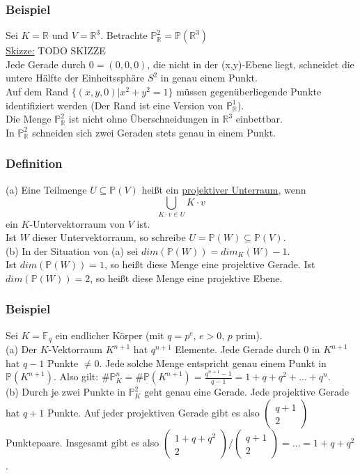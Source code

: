 \documentclass[a4paper]{article}
\newcommand{\ul}{\underline}
\begin{document}
\subsubsection{Beispiel}
Sei \(K=\mathbb{R}\) und \(V=\mathbb{R}^3\). Betrachte \(\mathbb{P}_\mathbb{R}^2=\mathbb{P}(\mathbb{R}^3)\)\\
\ul{Skizze:} TODO SKIZZE\\
Jede Gerade durch \(0=(0, 0, 0)\), die nicht in der (x,y)-Ebene liegt, schneidet die untere Hälfte der Einheitssphäre \(S^2\) in genau einem Punkt.\\
Auf dem Rand \(\{(x,y,0)|x^2+y^2=1\}\) müssen gegenüberliegende Punkte identifiziert werden (Der Rand ist eine Version von \(\mathbb{P}_\mathbb{R}^1\)).\\
Die Menge \(\mathbb{P}_\mathbb{R}^2\) ist nicht ohne Überschneidungen in \(\mathbb{R}^3\) einbettbar.\\
In \(\mathbb{P}_\mathbb{R}^2\) schneiden sich zwei Geraden stets genau in einem Punkt.
\subsubsection{Definition}
(a) Eine Teilmenge \(U\subseteq\mathbb{P}(V)\) heißt ein \ul{projektiver Unterraum}, wenn
$$\bigcup_{K\cdot v\in U}K\cdot v$$
ein \(K\)-Untervektorraum von \(V\) ist.\\
Ist \(W\) dieser Untervektorraum, so schreibe \(U=\mathbb{P}(W)\subseteq\mathbb{P}(V)\).\\
(b) In der Situation von (a) sei \(dim(\mathbb{P}(W))=dim_K(W)-1\).\\
Ist \(dim(\mathbb{P}(W))=1\), so heißt diese Menge eine projektive Gerade. Ist \(dim(\mathbb{P}(W))=2\), so heißt diese Menge eine projektive Ebene.
\subsubsection{Beispiel}
Sei \(K=\mathbb{F}_q\) ein endlicher Körper (mit \(q=p^e\), \(e>0\), \(p\) prim).\\
(a) Der \(K\)-Vektorraum \(K^{n+1}\) hat \(q^{n+1}\) Elemente. Jede Gerade durch 0 in \(K^{n+1}\) hat \(q-1\) Punkte \(\neq 0\). Jede solche Menge entspricht genau einem Punkt in \(\mathbb{P}(K^{n+1})\). Also gilt: \(\#\mathbb{P}_K^n=\#\mathbb{P}(K^{n+1})=\frac{q^{n+1}-1}{q-1}=1+q+q^2+\dots+q^n\).\\
(b) Durch je zwei Punkte in \(\mathbb{P}_K^2\) geht genau eine Gerade. Jede projektive Gerade hat \(q+1\) Punkte. Auf jeder projektiven Gerade gibt es also \(\begin{pmatrix}
q+1\\
2
\end{pmatrix}\) Punktepaare. Insgesamt gibt es also \(\begin{pmatrix}
1+q+q^2\\
2
\end{pmatrix}/\begin{pmatrix}
q+1\\
2
\end{pmatrix}=\dots=1+q+q^2\).
\end{document}
